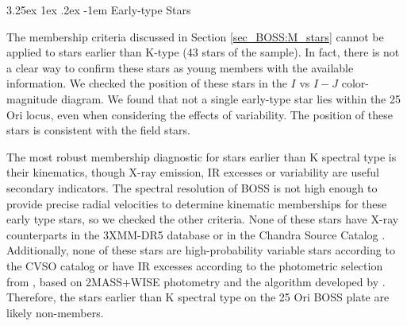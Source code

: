 \documentclass[12pt]{article}
\makeatletter
\renewcommand\paragraph{\@startsection{paragraph}{5}{\z@}%
  {3.25ex \@plus1ex \@minus.2ex}%
  {-1em}%
  {\normalfont\normalsize\bfseries}}
\makeatother
\begin{document}
\paragraph{Early-type Stars\\}
\label{sec_BOSS:early_stars}

The membership criteria discussed in Section \ref{sec_BOSS:M_stars} cannot be applied to stars earlier than K-type (43 stars of the sample). In fact, there is not a clear way to confirm these stars as young members with the available information. We checked the position of these stars in the $I$ vs $I-J$ color-magnitude diagram. We found that not a single early-type star lies within the 25 Ori locus, even when considering the effects of variability. The position of these stars is consistent with the field stars.

The most robust membership diagnostic for stars earlier than K spectral type is their kinematics, though X-ray emission, IR excesses or variability are useful secondary indicators. The spectral resolution of BOSS is not high enough to provide precise radial velocities to determine kinematic memberships for these early type stars, so we checked the other criteria. None of these stars have X-ray counterparts in the 3XMM-DR5 database \citep{Rosen2016} or in the Chandra Source Catalog \citep{Evans2010}. Additionally, none of these stars are high-probability variable stars according to the CVSO catalog or have IR excesses according to the photometric selection from \citet{Cottle2018}, based on 2MASS+WISE photometry and the algorithm developed by \citet{Koenig2014}. Therefore, the stars earlier than K spectral type on the 25 Ori BOSS plate are likely non-members.
\end{document}
